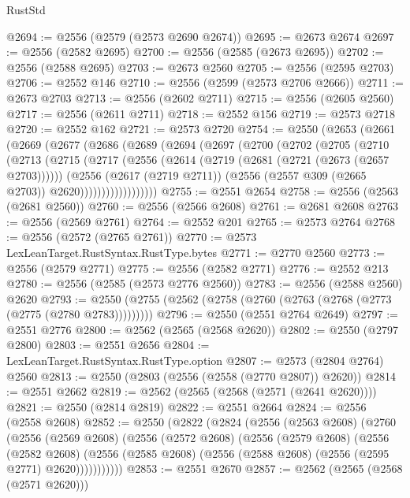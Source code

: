 \begin{lexlean}{RustStd}
\begin{coremodule}
{\begin{coremodule}
{{{{{{{{{{{{{{{{{{{{{{{{{{{{{{{{@2694 := @2556 (@2579 (@2573 @2690 @2674))
@2695 := @2673 @2674
@2697 := @2556 (@2582 @2695)
@2700 := @2556 (@2585 (@2673 @2695))
@2702 := @2556 (@2588 @2695)
@2703 := @2673 @2560
@2705 := @2556 (@2595 @2703)
@2706 := @2552 @146
@2710 := @2556 (@2599 (@2573 @2706 @2666))
@2711 := @2673 @2703
@2713 := @2556 (@2602 @2711)
@2715 := @2556 (@2605 @2560)
@2717 := @2556 (@2611 @2711)
@2718 := @2552 @156
@2719 := @2573 @2718
@2720 := @2552 @162
@2721 := @2573 @2720
@2754 := @2550
    (@2653
      (@2661
        (@2669
          (@2677
            (@2686
              (@2689
                (@2694
                  (@2697
                    (@2700
                      (@2702
                        (@2705
                          (@2710
                            (@2713
                              (@2715
                                (@2717
                                  (@2556
                                    (@2614 (@2719 (@2681 (@2721 (@2673 (@2657 @2703))))))
                                    (@2556
                                      (@2617 (@2719 @2711))
                                      (@2556 (@2557 @309 (@2665 @2703)) @2620))))))))))))))))))
@2755 := @2551 @2654
@2758 := @2556 (@2563 (@2681 @2560))
@2760 := @2556 (@2566 @2608)
@2761 := @2681 @2608
@2763 := @2556 (@2569 @2761)
@2764 := @2552 @201
@2765 := @2573 @2764
@2768 := @2556 (@2572 (@2765 @2761))
@2770 := @2573 LexLeanTarget.RustSyntax.RustType.bytes
@2771 := @2770 @2560
@2773 := @2556 (@2579 @2771)
@2775 := @2556 (@2582 @2771)
@2776 := @2552 @213
@2780 := @2556 (@2585 (@2573 @2776 @2560))
@2783 := @2556 (@2588 @2560) @2620
@2793 := @2550 (@2755 (@2562 (@2758 (@2760 (@2763 (@2768 (@2773 (@2775 (@2780 @2783)))))))))
@2796 := @2550 (@2551 @2764 @2649)
@2797 := @2551 @2776
@2800 := @2562 (@2565 (@2568 @2620))
@2802 := @2550 (@2797 @2800)
@2803 := @2551 @2656
@2804 := LexLeanTarget.RustSyntax.RustType.option
@2807 := @2573 (@2804 @2764) @2560
@2813 := @2550 (@2803 (@2556 (@2558 (@2770 @2807)) @2620))
@2814 := @2551 @2662
@2819 := @2562 (@2565 (@2568 (@2571 (@2641 @2620))))
@2821 := @2550 (@2814 @2819)
@2822 := @2551 @2664
@2824 := @2556 (@2558 @2608)
@2852 := @2550
    (@2822
      (@2824
        (@2556
          (@2563 @2608)
          (@2760
            (@2556
              (@2569 @2608)
              (@2556
                (@2572 @2608)
                (@2556
                  (@2579 @2608)
                  (@2556
                    (@2582 @2608)
                    (@2556 (@2585 @2608) (@2556 (@2588 @2608) (@2556 (@2595 @2771) @2620)))))))))))
@2853 := @2551 @2670
@2857 := @2562 (@2565 (@2568 (@2571 @2620)))
}}}}}}}}}}}}}}}}}}}}}}}}}}}}}}}}
\end{coremodule}}
\end{coremodule}
\end{lexlean}
